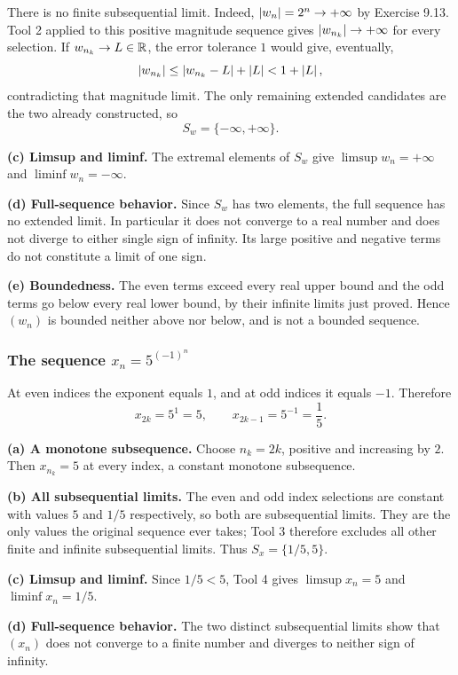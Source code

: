 There is no finite subsequential limit. Indeed,
$\left|w_n\right|=2^n\to+\infty$ by Exercise 9.13.
Tool 2 applied to this positive magnitude sequence gives
$\left|w_{n_k}\right|\to+\infty$ for every selection.
If $w_{n_k}\to L\in\mathbb{R}$, the error tolerance $1$ would
give, eventually,
\[
 \left|w_{n_k}\right|\leq\left|w_{n_k}-L\right|+\left|L\right|<1+\left|L\right|,
\]
contradicting that magnitude limit. The only remaining
extended candidates are the two already constructed, so
\[
 S_w=\{-\infty,+\infty\}.
\]

\textbf{(c) Limsup and liminf.}
The extremal elements of $S_w$ give
$\limsup w_n=+\infty$ and $\liminf w_n=-\infty$.

\textbf{(d) Full-sequence behavior.}
Since $S_w$ has two elements, the full sequence has no
extended limit. In particular it does not converge to a real
number and does not diverge to either single sign of infinity.
Its large positive and negative terms do not constitute a
limit of one sign.

\textbf{(e) Boundedness.}
The even terms exceed every real upper bound and the odd
terms go below every real lower bound, by their infinite
limits just proved. Hence $(w_n)$ is bounded neither above
nor below, and is not a bounded sequence.

\subsubsection*{The sequence $x_n=5^{(-1)^n}$}

At even indices the exponent equals $1$, and at odd indices
it equals $-1$. Therefore
\[
 x_{2k}=5^1=5,\qquad x_{2k-1}=5^{-1}=\frac15.
\]

\textbf{(a) A monotone subsequence.}
Choose $n_k=2k$, positive and increasing by $2$.
Then $x_{n_k}=5$ at every index, a constant monotone subsequence.

\textbf{(b) All subsequential limits.}
The even and odd index selections are constant with values
$5$ and $1/5$ respectively, so both are subsequential limits.
They are the only values the original sequence ever takes;
Tool 3 therefore excludes all other finite and infinite
subsequential limits. Thus $S_x=\{1/5,5\}$.

\textbf{(c) Limsup and liminf.}
Since $1/5<5$, Tool 4 gives
$\limsup x_n=5$ and $\liminf x_n=1/5$.

\textbf{(d) Full-sequence behavior.}
The two distinct subsequential limits show that $(x_n)$
does not converge to a finite number and diverges to neither
sign of infinity.

